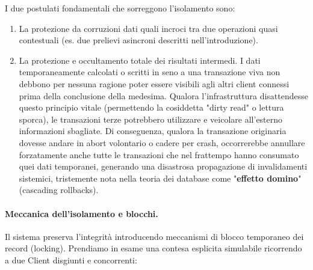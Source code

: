 I due postulati fondamentali che sorreggono l'isolamento sono:
\begin{enumerate}
    \item La protezione da corruzioni dati quali incroci tra due operazioni quasi contestuali (es. due prelievi asincroni descritti nell'introduzione).
    \item La protezione e occultamento totale dei risultati intermedi. I dati temporaneamente calcolati o scritti in seno a una transazione viva non debbono per nessuna ragione poter essere visibili agli altri client connessi prima della conclusione della medesima. Qualora l'infrastruttura disattendesse questo principio vitale (permettendo la cosiddetta "dirty read" o lettura sporca), le transazioni terze potrebbero utilizzare e veicolare all'esterno informazioni sbagliate. Di conseguenza, qualora la transazione originaria dovesse andare in abort volontario o cadere per crash, occorrerebbe annullare forzatamente anche tutte le transazioni che nel frattempo hanno consumato quei dati temporanei, generando una disastrosa propagazione di invalidamenti sistemici, tristemente nota nella teoria dei database come "\textbf{effetto domino}" (cascading rollbacks).
\end{enumerate}

\paragraph{Meccanica dell'isolamento e blocchi.}
Il sistema preserva l'integrità introducendo meccanismi di blocco temporaneo dei record (locking).
Prendiamo in esame una contesa esplicita simulabile ricorrendo a due Client disgiunti e concorrenti:

